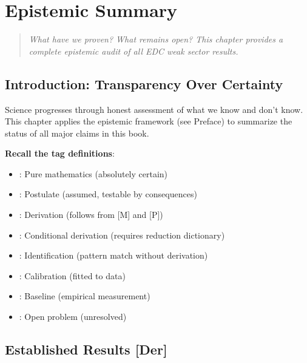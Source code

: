 \chapter{Epistemic Summary}
\label{ch:epistemic_summary}

\begin{quote}
\textit{What have we proven? What remains open? This chapter provides
a complete epistemic audit of all EDC weak sector results.}
\end{quote}

\section{Introduction: Transparency Over Certainty}
\label{sec:epis_intro}

Science progresses through honest assessment of what we know and don't know.
This chapter applies the epistemic framework (see Preface) to summarize
the status of all major claims in this book.

\textbf{Recall the tag definitions}:
\begin{itemize}[nosep]
\item \tagM{}: Pure mathematics (absolutely certain)
\item \tagP{}: Postulate (assumed, testable by consequences)
\item \tagDer{}: Derivation (follows from [M] and [P])
\item \tagDc{}: Conditional derivation (requires reduction dictionary)
\item \tagI{}: Identification (pattern match without derivation)
\item \tagCal{}: Calibration (fitted to data)
\item \tagBL{}: Baseline (empirical measurement)
\item \tagOpen{}: Open problem (unresolved)
\end{itemize}

\section{Established Results [Der]}
\label{sec:established}

